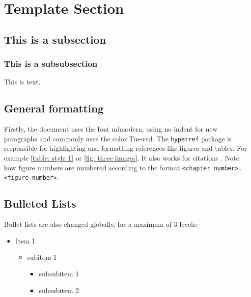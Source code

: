 \section{Template Section}
\label{sec:Template}       %

\subsection{This is a subsection}
    \subsubsection{This is a subsubsection}
    This is text.

\subsection{General formatting}
Firstly, the document uses the font mlmodern, using no indent for new paragraphs and commonly uses the color \textcolor{Tue-red}{Tue-red}.
The \texttt{hyperref} package is responsible for highlighting and formatting references like figures and tables. For example \cref{table: style 1} or \cref{fig: three images}. It also works for citations \cite{texbook}. Note how figure numbers are numbered according to the format \texttt{<chapter number>.<figure number>}.\\

\subsection{Bulleted Lists}
Bullet lists are also changed globally, for a maximum of 3 levels:

\begin{itemize}
    \item Item 1
    \begin{itemize}
        \item subitem 1
        \begin{itemize}
            \item subsubitem 1
            \item subsubitem 2
        \end{itemize}
    \end{itemize}
\end{itemize}

